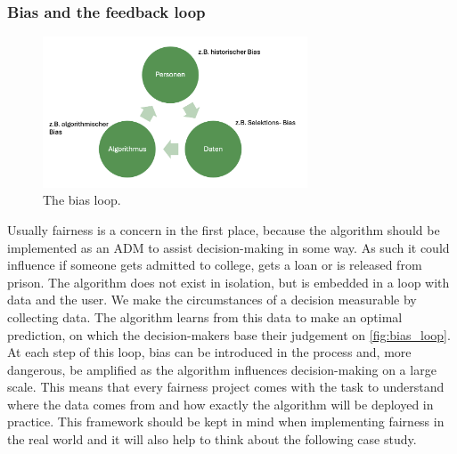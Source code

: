 \subsubsection*{Bias and the feedback loop}
\begin{figure}
    \centering
    \includegraphics[width=0.7\textwidth]{../figures/bias_loop.png}
    \caption{The bias loop.}
    \label{fig:bias_loop}
\end{figure}

Usually fairness is a concern in the first place, because the algorithm should be implemented as an ADM to assist decision-making in some way. As such it could influence if someone gets admitted to college, gets a loan or is released from prison. The algorithm does not exist in isolation, but is embedded in a loop with data and the user.
We make the circumstances of a decision measurable by collecting data. The algorithm learns from this data to make an optimal prediction, on which the decision-makers base their judgement on \autoref{fig:bias_loop}. At each step of this loop, bias can be introduced in the process and, more dangerous, be amplified as the algorithm influences decision-making on a large scale.
This means that every fairness project comes with the task to understand where the data comes from and how exactly the algorithm will be deployed in practice. This framework should be kept in mind when implementing fairness in the real world and it will also help to think about the following case study.

